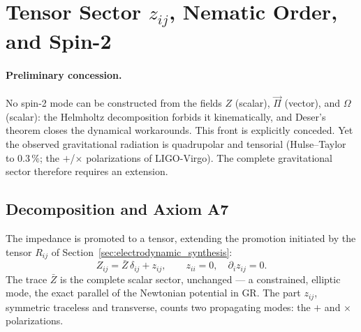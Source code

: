 \documentclass[11pt,a4paper]{article}
\theoremstyle{plain}
\theoremstyle{remark}
\begin{document}
\begin{itemize}
\end{itemize}

\section{Tensor Sector $z_{ij}$, Nematic Order, and Spin-2}
\label{sec:tensor_sector}

\paragraph{Preliminary concession.} No spin-2 mode can be constructed from the fields $Z$ (scalar), $\vec{\Pi}$ (vector), and $\Omega$ (scalar): the Helmholtz decomposition forbids it kinematically, and Deser's theorem \cite{deser1970} closes the dynamical workarounds. This front is explicitly conceded. Yet the observed gravitational radiation is quadrupolar and tensorial (Hulse--Taylor to $0.3\,\%$; the $+$/$\times$ polarizations of LIGO-Virgo). The complete gravitational sector therefore requires an extension.

\subsection{Decomposition and Axiom A7}
The impedance is promoted to a tensor, extending the promotion initiated by the tensor $R_{ij}$ of Section~\ref{sec:electrodynamic_synthesis}:
\begin{equation}
Z_{ij} = \bar{Z}\,\delta_{ij} + z_{ij}, \qquad z_{ii} = 0, \quad \partial_i z_{ij} = 0.
\end{equation}
The trace $\bar{Z}$ is the complete scalar sector, unchanged --- a constrained, elliptic mode, the exact parallel of the Newtonian potential in GR. The part $z_{ij}$, symmetric traceless and transverse, counts two propagating modes: the $+$ and $\times$ polarizations.
\end{document}
